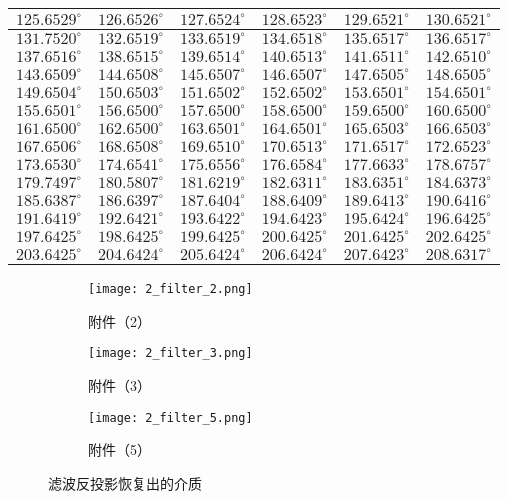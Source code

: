 \begin{longtable}{@{}cccccc@{}}
$125.6529^\circ$ & $126.6526^\circ$ & $127.6524^\circ$ & $128.6523^\circ$ & $129.6521^\circ$ & $130.6521^\circ$\\ \hline
$131.7520^\circ$ & $132.6519^\circ$ & $133.6519^\circ$ & $134.6518^\circ$ & $135.6517^\circ$ & $136.6517^\circ$\\ \hline
$137.6516^\circ$ & $138.6515^\circ$ & $139.6514^\circ$ & $140.6513^\circ$ & $141.6511^\circ$ & $142.6510^\circ$\\ \hline
$143.6509^\circ$ & $144.6508^\circ$ & $145.6507^\circ$ & $146.6507^\circ$ & $147.6505^\circ$ & $148.6505^\circ$\\ \hline
$149.6504^\circ$ & $150.6503^\circ$ & $151.6502^\circ$ & $152.6502^\circ$ & $153.6501^\circ$ & $154.6501^\circ$\\ \hline
$155.6501^\circ$ & $156.6500^\circ$ & $157.6500^\circ$ & $158.6500^\circ$ & $159.6500^\circ$ & $160.6500^\circ$\\ \hline
$161.6500^\circ$ & $162.6500^\circ$ & $163.6501^\circ$ & $164.6501^\circ$ & $165.6503^\circ$ & $166.6503^\circ$\\ \hline
$167.6506^\circ$ & $168.6508^\circ$ & $169.6510^\circ$ & $170.6513^\circ$ & $171.6517^\circ$ & $172.6523^\circ$\\ \hline
$173.6530^\circ$ & $174.6541^\circ$ & $175.6556^\circ$ & $176.6584^\circ$ & $177.6633^\circ$ & $178.6757^\circ$\\ \hline
$179.7497^\circ$ & $180.5807^\circ$ & $181.6219^\circ$ & $182.6311^\circ$ & $183.6351^\circ$ & $184.6373^\circ$\\ \hline
$185.6387^\circ$ & $186.6397^\circ$ & $187.6404^\circ$ & $188.6409^\circ$ & $189.6413^\circ$ & $190.6416^\circ$\\ \hline
$191.6419^\circ$ & $192.6421^\circ$ & $193.6422^\circ$ & $194.6423^\circ$ & $195.6424^\circ$ & $196.6425^\circ$\\ \hline
$197.6425^\circ$ & $198.6425^\circ$ & $199.6425^\circ$ & $200.6425^\circ$ & $201.6425^\circ$ & $202.6425^\circ$\\ \hline
$203.6425^\circ$ & $204.6424^\circ$ & $205.6424^\circ$ & $206.6424^\circ$ & $207.6423^\circ$ & $208.6317^\circ$\\ \hline
\end{longtable}

\begin{figure}[htbp]
  \centering
  \begin{subfigure}[b]{0.3\textwidth}
    \texttt{[image: 2\_filter\_2.png]}
    \caption{附件（2）}
  \end{subfigure}%
  \hfill
  \begin{subfigure}[b]{0.3\textwidth}
    \texttt{[image: 2\_filter\_3.png]}
    \caption{附件（3）}
  \end{subfigure}%
  \hfill
  \begin{subfigure}[b]{0.3\textwidth}
    \texttt{[image: 2\_filter\_5.png]}
    \caption{附件（5）}
  \end{subfigure}
  \caption{滤波反投影恢复出的介质}
  \label{fig:4_filter_copy}
\end{figure}

